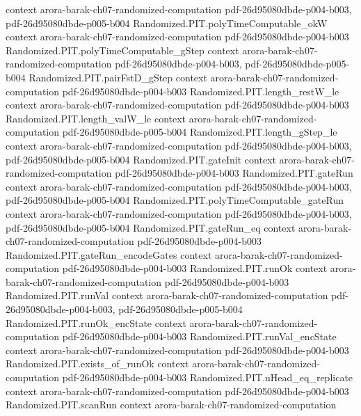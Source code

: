 \begin{theorem}
  {context}
  {arora-barak-ch07-randomized-computation}
  {pdf-26d95080dbde-p004-b003,
    pdf-26d95080dbde-p005-b004}
\proofstep
  {Randomized.PIT.polyTimeComputable_okW}
  {context}
  {arora-barak-ch07-randomized-computation}
  {pdf-26d95080dbde-p004-b003}
\proofstep
  {Randomized.PIT.polyTimeComputable_gStep}
  {context}
  {arora-barak-ch07-randomized-computation}
  {pdf-26d95080dbde-p004-b003,
    pdf-26d95080dbde-p005-b004}
\proofstep
  {Randomized.PIT.pairFstD_gStep}
  {context}
  {arora-barak-ch07-randomized-computation}
  {pdf-26d95080dbde-p004-b003}
\proofstep
  {Randomized.PIT.length_restW_le}
  {context}
  {arora-barak-ch07-randomized-computation}
  {pdf-26d95080dbde-p004-b003}
\proofstep
  {Randomized.PIT.length_valW_le}
  {context}
  {arora-barak-ch07-randomized-computation}
  {pdf-26d95080dbde-p005-b004}
\proofstep
  {Randomized.PIT.length_gStep_le}
  {context}
  {arora-barak-ch07-randomized-computation}
  {pdf-26d95080dbde-p004-b003,
    pdf-26d95080dbde-p005-b004}
\proofstep
  {Randomized.PIT.gateInit}
  {context}
  {arora-barak-ch07-randomized-computation}
  {pdf-26d95080dbde-p004-b003}
\proofstep
  {Randomized.PIT.gateRun}
  {context}
  {arora-barak-ch07-randomized-computation}
  {pdf-26d95080dbde-p004-b003,
    pdf-26d95080dbde-p005-b004}
\proofstep
  {Randomized.PIT.polyTimeComputable_gateRun}
  {context}
  {arora-barak-ch07-randomized-computation}
  {pdf-26d95080dbde-p004-b003,
    pdf-26d95080dbde-p005-b004}
\proofstep
  {Randomized.PIT.gateRun_eq}
  {context}
  {arora-barak-ch07-randomized-computation}
  {pdf-26d95080dbde-p004-b003}
\proofstep
  {Randomized.PIT.gateRun_encodeGates}
  {context}
  {arora-barak-ch07-randomized-computation}
  {pdf-26d95080dbde-p004-b003}
\proofstep
  {Randomized.PIT.runOk}
  {context}
  {arora-barak-ch07-randomized-computation}
  {pdf-26d95080dbde-p004-b003}
\proofstep
  {Randomized.PIT.runVal}
  {context}
  {arora-barak-ch07-randomized-computation}
  {pdf-26d95080dbde-p004-b003,
    pdf-26d95080dbde-p005-b004}
\proofstep
  {Randomized.PIT.runOk_encState}
  {context}
  {arora-barak-ch07-randomized-computation}
  {pdf-26d95080dbde-p004-b003}
\proofstep
  {Randomized.PIT.runVal_encState}
  {context}
  {arora-barak-ch07-randomized-computation}
  {pdf-26d95080dbde-p004-b003}
\proofstep
  {Randomized.PIT.exists_of_runOk}
  {context}
  {arora-barak-ch07-randomized-computation}
  {pdf-26d95080dbde-p004-b003}
\proofstep
  {Randomized.PIT.uHead_eq_replicate}
  {context}
  {arora-barak-ch07-randomized-computation}
  {pdf-26d95080dbde-p004-b003}
\proofstep
  {Randomized.PIT.scanRun}
  {context}
  {arora-barak-ch07-randomized-computation}

\end{theorem}
